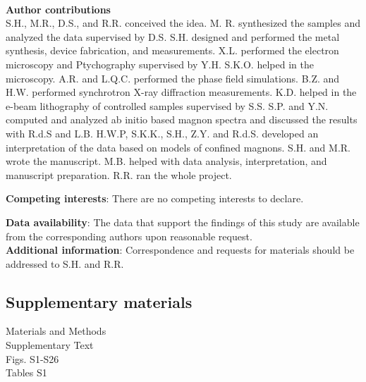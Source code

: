 \documentclass[12pt]{article}
\begin{document}
\\
    \noindent\textbf{Author contributions}\\
    S.H., M.R., D.S., and R.R. conceived the idea. M. R. synthesized the samples and analyzed the data supervised by D.S. S.H. designed and performed the metal synthesis, device fabrication, and measurements. X.L. performed the electron microscopy and Ptychography supervised by Y.H. S.K.O. helped in the microscopy. A.R. and L.Q.C. performed the phase field simulations. B.Z. and H.W. performed synchrotron X-ray diffraction measurements. K.D. helped in the e-beam lithography of controlled samples supervised by S.S. S.P. and Y.N. computed and analyzed ab initio based magnon spectra and discussed the results with R.d.S and L.B. H.W.P, S.K.K., S.H., Z.Y. and R.d.S. developed an interpretation of the data based on models of confined magnons. S.H. and M.R. wrote the manuscript. M.B. helped with data analysis, interpretation, and manuscript preparation. R.R. ran the whole project.

    \noindent\textbf{Competing interests}:  There are no competing interests to declare.
    
    \noindent\textbf{Data availability}:   The data that support the findings of this study are available from the corresponding authors upon reasonable request.\\  
    \noindent\textbf{Additional information}:    Correspondence and requests for materials should be addressed to S.H. and R.R.\\

\subsection*{Supplementary materials}
Materials and Methods\\
Supplementary Text\\
Figs. S1-S26 \\
Tables S1\\
\end{document}
